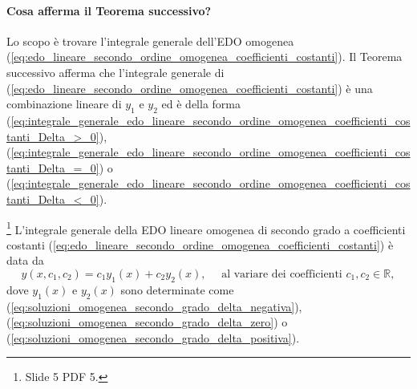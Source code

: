 \paragraph{Cosa afferma il Teorema successivo?} Lo scopo è trovare l'integrale generale dell'EDO omogenea (\ref{eq:edo_lineare_secondo_ordine_omogenea_coefficienti_costanti}). Il Teorema successivo afferma che l'integrale generale di (\ref{eq:edo_lineare_secondo_ordine_omogenea_coefficienti_costanti}) è una combinazione lineare di $y_1$ e $y_2$ ed è della forma (\ref{eq:integrale_generale_edo_lineare_secondo_ordine_omogenea_coefficienti_costanti_Delta_>_0}), (\ref{eq:integrale_generale_edo_lineare_secondo_ordine_omogenea_coefficienti_costanti_Delta_=_0}) o (\ref{eq:integrale_generale_edo_lineare_secondo_ordine_omogenea_coefficienti_costanti_Delta_<_0}). 

\begin{theorem}\footnote{Slide 5 PDF 5.}
	L'integrale generale della EDO lineare omogenea di secondo grado a coefficienti costanti (\ref{eq:edo_lineare_secondo_ordine_omogenea_coefficienti_costanti}) è data da
	\begin{equation}\label{eq:integrale_generale_edo_lineare_secondo_ordine_omogenea_coefficienti_costanti}
		y(x,c_1,c_2) = c_1y_1(x) + c_2y_2(x),\quad \text{ al variare dei coefficienti } c_1,c_2\in\mathbb{R},
	\end{equation}
	dove $y_1(x)$ e $y_2(x)$ sono determinate come (\ref{eq:soluzioni_omogenea_secondo_grado_delta_negativa}), (\ref{eq:soluzioni_omogenea_secondo_grado_delta_zero}) o  (\ref{eq:soluzioni_omogenea_secondo_grado_delta_positiva}).
\end{theorem}
